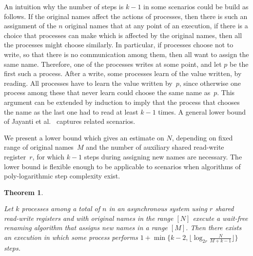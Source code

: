 \documentclass[11pt]{article}
\newtheorem{theorem}{Theorem}
\begin{document}
An intuition why the number of steps is $k-1$ in some scenarios could be build as follows. 
If the original names affect the actions of processes, then there is such an assignment of the $n$ original names that at any point of an execution, if there is a choice that processes can make which is affected by the original names, then all the processes might choose similarly.
In particular, if processes choose not to write, so that there is no communication among them, then all want to assign the same name.
Therefore, one of the processes writes at some point, and let $p$ be the first such a process.
After a write, some processes learn of the value written, by reading. 
All processes have to learn the value written by~$p$, since otherwise one process among these that never learn could choose the same name as~$p$.
This argument can be extended by induction to imply that the process that chooses the name as the last one had to read at least $k-1$ times.
A general lower bound of Jayanti et al.~\cite{JayantiTT00} captures related scenarios.

We present a lower bound which gives an estimate on $N$, depending on fixed range of original names~$M$ and the number of auxiliary shared read-write register~$r$, for which $k-1$ steps during assigning new names are necessary.
The lower bound is flexible enough to be applicable to scenarios when algorithms of poly-logarithmic step complexity exist.




\begin{theorem}
\label{thm:rename-lower-bound}

Let $k$ processes among a total of $n$ in an asynchronous system using $r$ shared read-write registers and with original names in the range $[N]$ execute a wait-free renaming algorithm that assigns new names in a range $[M]$. 
Then there exists an execution in which some process performs $1+\min\{k-2,\lfloor\log_{2r} \frac{N}{M+k-1}\rfloor\}$ steps.
\end{theorem}
\end{document}
